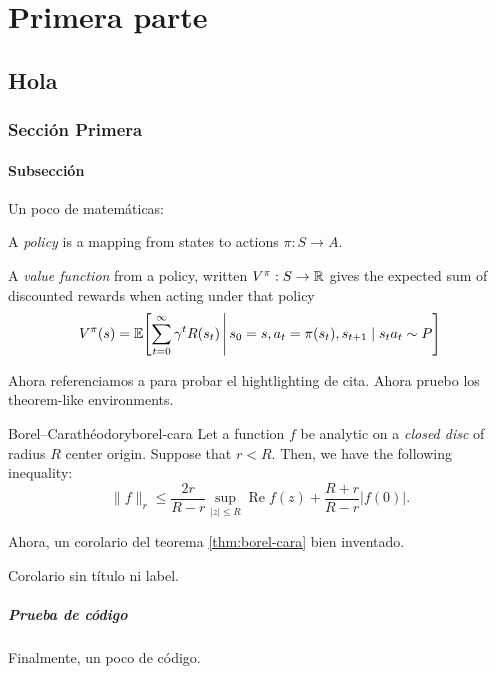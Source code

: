 \part{Primera parte}
\chapter{Hola}

\section{Sección Primera}
\lipsum[1-2]

\subsection{Subsección}
Un poco de matemáticas:

A \emph{policy} is a mapping from states to actions $\pi: S \to A$.

A \emph{value function} from a policy, written $V^{\pi}: S \to \mathbb{R}$ gives the expected sum 
of discounted rewards when acting under that policy
\begin{equation}
	V^{\pi} (s) = \E*{\sum_{t=0}^{\infty} \gamma^t R(s_t) \vertsep s_0 =s, a_t = \pi(s_t), 
	s_{t+1} \mid s_t a_t \sim P}
\end{equation}

Ahora referenciamos a \cite{ths:RodZ} para probar el hightlighting de cita. Ahora pruebo 
los theorem-like environments.

\begin{thrm}{Borel--Carathéodory}{borel-cara}
Let a function $f$ be analytic on a \emph{closed disc} of radius $R$ center origin.
Suppose that $r < R$. Then, we have the following inequality:
\begin{equation}
\|f\|_r \le \frac{2r}{R-r} \sup_{|z| \le R} \operatorname{Re} f(z) + \frac{R+r}{R-r} 
|f(0)|.
\end{equation}
\end{thrm}

Ahora, un corolario del teorema \ref{thm:borel-cara} bien inventado.

\begin{coro}{}{}
	Corolario sin título ni label.
\end{coro}

\subsubsection{Prueba de código}
Finalmente, un poco de código.

